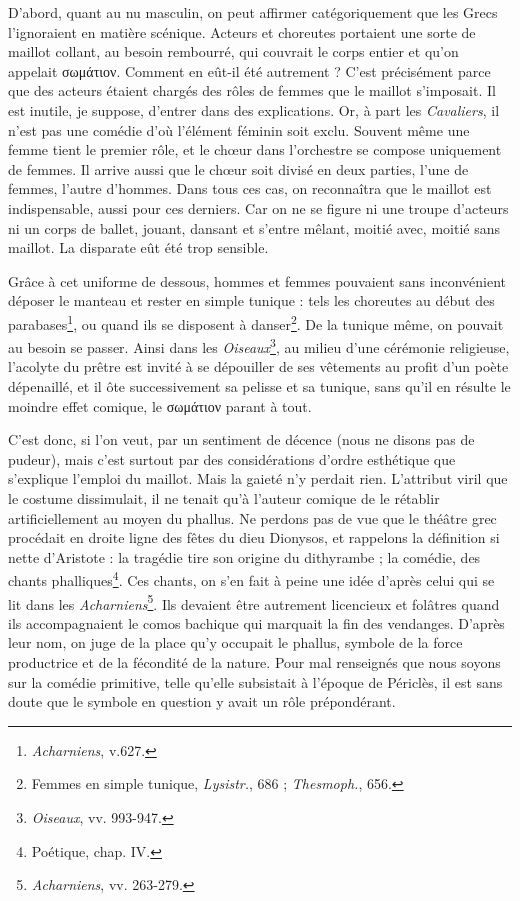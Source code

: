 \documentclass{book}%
\newcommand{\italique}[1]{\textit{#1}}%
\newcommand{\note}[1]{\footnote{#1}}
\begin{document}
D'abord, quant au nu masculin, on peut affirmer catégoriquement que les Grecs l'ignoraient en matière scénique. Acteurs et choreutes portaient une sorte de maillot collant, au besoin rembourré, qui couvrait le corps entier et qu'on appelait σωμάτιον. Comment en eût-il été autrement ? C'est précisément parce que des acteurs étaient chargés des rôles de femmes que le maillot s'imposait. Il est inutile, je suppose, d'entrer dans des explications. Or, à part les \italique{Cavaliers}, il n'est pas une comédie d'où l'élément féminin soit exclu. Souvent même une femme tient le premier rôle, et le chœur dans l'orchestre se compose uniquement de femmes. Il arrive aussi que le chœur soit divisé en deux parties, l'une de femmes, l'autre d'hommes. Dans tous ces cas, on reconnaîtra que le maillot est indispensable, aussi pour ces derniers. Car on ne se figure ni une troupe d'acteurs ni un corps de ballet, jouant, dansant et s'entre mêlant, moitié avec, moitié sans maillot. La disparate eût été trop sensible. 

Grâce à cet uniforme de dessous, hommes et femmes pouvaient sans inconvénient déposer le manteau et rester en simple tunique : tels les choreutes au début des parabases\note{\italique{Acharniens}, v.627.}, ou quand ils se disposent à danser\note{Femmes en simple tunique, \italique{Lysistr.}, 686 ; \italique{Thesmoph.}, 656.}. De la tunique même, on pouvait au besoin se passer. Ainsi dans les \italique{Oiseaux}\note{\italique{Oiseaux}, vv. 993-947.}, au milieu d'une cérémonie religieuse, l'acolyte du prêtre est invité à se dépouiller de ses vêtements au profit d'un poète dépenaillé, et il ôte successivement sa pelisse et sa tunique, sans qu'il en résulte le moindre effet comique, le σωμάτιον parant à tout. 

C'est donc, si l'on veut, par un sentiment de décence (nous ne disons pas de pudeur), mais c'est surtout par des considérations d'ordre esthétique que s'explique l'emploi du maillot. Mais la gaieté n'y perdait rien. L'attribut viril que le costume dissimulait, il ne tenait qu'à l'auteur comique de le rétablir artificiellement au moyen du phallus. Ne perdons pas de vue que le théâtre grec procédait en droite ligne des fêtes du dieu Dionysos, et rappelons la définition si nette d'Aristote : la tragédie tire son origine du dithyrambe ; la comédie, des chants phalliques\note{Poétique, chap. IV.}. Ces chants, on s'en fait à peine une idée d'après celui qui se lit dans les \italique{Acharniens}\note{\italique{Acharniens}, vv. 263-279.}.
Ils devaient être autrement licencieux et folâtres quand ils accompagnaient le comos bachique qui marquait la fin des vendanges. D'après leur nom, on juge de la place qu'y occupait le phallus, symbole de la force productrice et de la fécondité de la nature. Pour mal renseignés que nous soyons sur la comédie primitive, telle qu'elle subsistait à l'époque de Périclès, il est sans doute que le symbole en question y avait un rôle prépondérant. 
\end{document}
